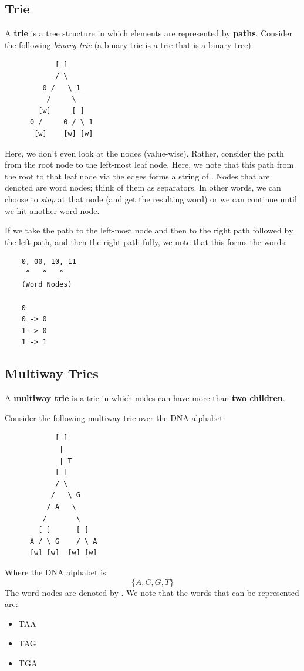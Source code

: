 \documentclass[letterpaper]{article}
\begin{document}
\subsection{Trie}
A \textbf{trie} is a tree structure in which elements are represented by \textbf{paths}. Consider the following \emph{binary trie} (a binary trie is a trie that is a binary tree):
\begin{verbatim}
            [ ]
            / \ 
         0 /   \ 1
          /     \ 
        [w]     [ ]
      0 /     0 / \ 1 
       [w]    [w] [w]
\end{verbatim}
Here, we don't even look at the nodes (value-wise). Rather, consider the path from the root node to the left-most leaf node. Here, we note that this path from the root to that leaf node via the edges forms a string of . Nodes that are denoted \code{[w]} are word nodes; think of them as separators. In other words, we can choose to \emph{stop} at that node (and get the resulting word) or we can continue until we hit another word node. 

\bigskip

If we take the path to the left-most node and then to the right path followed by the left path, and then the right path fully, we note that this forms the words:  
\begin{verbatim}
    0, 00, 10, 11
     ^   ^   ^ 
    (Word Nodes)

    0 
    0 -> 0 
    1 -> 0
    1 -> 1
\end{verbatim}


\subsection{Multiway Tries}
A \textbf{multiway trie} is a trie in which nodes can have more than \textbf{two children}. 

\bigskip 

Consider the following multiway trie over the DNA alphabet:
\begin{verbatim}
            [ ]
             |
             | T
            [ ]
            / \ 
           /   \ G 
          / A   \ 
         /       \ 
        [ ]      [ ]
      A / \ G    / \ A
      [w] [w]  [w] [w]
\end{verbatim}
Where the DNA alphabet is: 
\[\{A, C, G, T\}\]
The word nodes are denoted by \code{[w]}. We note that the words that can be represented are: 
\begin{itemize}
    \item TAA 
    \item TAG 
    \item TGA 
\end{itemize}
\end{document}
